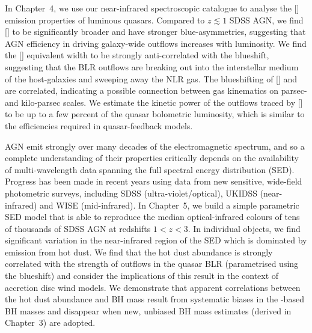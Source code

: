 \documentclass[a4paper,11pt]{article}
\newcommand\ion[2]{\text{#1\,\textsc{\lowercase{#2}}}}
\begin{document}
In Chapter~4, we use our near-infrared spectroscopic catalogue to analyse the [\ion{O}{III}] emission properties of luminous quasars. 
Compared to $z \lesssim 1$ SDSS AGN, we find [\ion{O}{III}] to be significantly broader and have stronger blue-asymmetries, suggesting that AGN efficiency in driving galaxy-wide outflows increases with luminosity. 
We find the [\ion{O}{III}] equivalent width to be strongly anti-correlated with the \ion{C}{IV} blueshift, suggesting that the BLR outflows are breaking out into the interstellar medium of the host-galaxies and sweeping away the NLR gas. 
The blueshifting of [\ion{O}{III}] and \ion{C}{IV} are correlated, indicating a possible connection between gas kinematics on parsec- and kilo-parsec scales. 
We estimate the kinetic power of the outflows traced by [\ion{O}{III}] to be up to a few percent of the quasar bolometric luminosity, which is similar to the efficiencies required in quasar-feedback models. 

AGN emit strongly over many decades of the electromagnetic spectrum, and so a complete understanding of their properties critically depends on the availability of multi-wavelength data spanning the full spectral energy distribution (SED). 
Progress has been made in recent years using data from new sensitive, wide-field photometric surveys, including SDSS (ultra-violet/optical), UKIDSS (near-infrared) and WISE (mid-infrared). 
In Chapter~5, we build a simple parametric SED model that is able to reproduce the median optical-infrared colours of tens of thousands of SDSS AGN at redshifts $1 < z < 3$. 
In individual objects, we find significant variation in the near-infrared region of the SED which is dominated by emission from hot dust.   
We find that the hot dust abundance is strongly correlated with the strength of outflows in the quasar BLR (parametrised using the \ion{C}{IV} blueshift) and consider the implications of this result in the context of accretion disc wind models.
We demonstrate that apparent correlations between the hot dust abundance and BH mass result from systematic biases in the \ion{C}{IV}-based BH masses and disappear when new, unbiased BH mass estimates (derived in Chapter~3) are adopted. 
\end{document}

